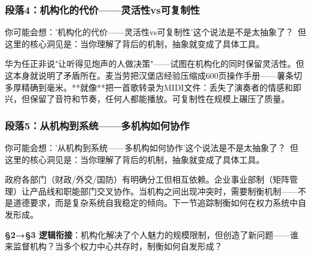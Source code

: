 \documentclass[a4paper,12pt]{book}
\newenvironment{motivation}{\begin{tcolorbox}[colback=gray!10,colframe=gray!60,title=\textit{动机}]\small\itshape}{\end{tcolorbox}}
\begin{document}
\begin{motivation}
\begin{motivation}
\begin{motivation}
	\subsubsection*{段落4：机构化的代价——灵活性vs可复制性}

	\begin{tcolorbox}[colback=yellow!5, title=\textit{读者行为预测}]
		你可能会想：'机构化的代价——灵活性vs可复制性'这个说法是不是太抽象了？\ 但这里的核心洞见是：当你理解了背后的机制，抽象就变成了具体工具。
	\end{tcolorbox}

华为任正非说"让听得见炮声的人做决策"——试图在机构化的同时保留灵活性。但这本身就说明了矛盾所在。麦当劳把汉堡店经验压缩成600页操作手册——薯条切多厚精确到毫米。**就像**把一首歌转录为MIDI文件：丢失了演奏者的情感和即兴，但保留了音符和节奏，任何人都能播放。可复制性在规模上碾压了质量。

	\subsubsection*{段落5：从机构到系统——多机构如何协作}

	\begin{tcolorbox}[colback=yellow!5, title=\textit{读者行为预测}]
		你可能会想：'从机构到系统——多机构如何协作'这个说法是不是太抽象了？\ 但这里的核心洞见是：当你理解了背后的机制，抽象就变成了具体工具。
	\end{tcolorbox}

政府各部门（财政/外交/国防）有明确分工但相互依赖。企业事业部制（矩阵管理）让产品线和职能部门交叉协作。当机构之间出现冲突时，需要制衡机制——不是道德要求，而是复杂系统自我稳定的倾向。下一节追踪制衡如何在权力系统中自发形成。

	\textbf{§2→§3 逻辑衔接}：机构化解决了个人魅力的规模限制，但创造了新问题——谁来监督机构？当多个权力中心共存时，制衡如何自发形成？

	

\end{motivation}
\end{motivation}
\end{motivation}
\end{document}
